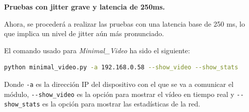 \newpage

\textbf{Pruebas con jitter grave y latencia de 250ms.}
\vspace{\baselineskip}

Ahora, se procederá a realizar las pruebas con una latencia base de 250 ms, lo que implica un nivel de jitter aún más pronunciado.
\vspace{\baselineskip}

El comando usado para \textit{Minimal\_Video} ha sido el siguiente:

\begin{lstlisting}[language=bash]
python minimal_video.py -a 192.168.0.58 --show_video --show_stats
\end{lstlisting}
Donde \verb|-a| es la dirección IP del dispositivo con el que se va a comunicar el módulo, \verb|--show_video| es la opción para mostrar el vídeo en tiempo real y \verb|--show_stats| es la opción para mostrar las estadísticas de la red.
\vspace{\baselineskip}

